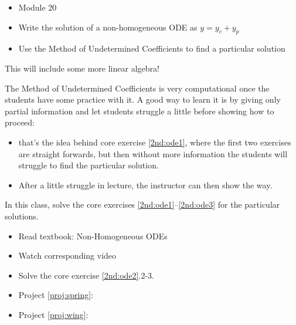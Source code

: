 \begin{lesson}

	\begin{itemize}
		\item Module 20
	\end{itemize}

	\begin{itemize}
		\item Write the solution of a non-homogeneous ODE as $y=y_c+y_p$
		\item Use the Method of Undetermined Coefficients to find a particular solution
	\end{itemize}
	

This will include some more linear algebra! 

The Method of Undetermined Coefficients is very computational once the students have some practice with it. A good way to learn it is by giving only partial information and let students struggle a little before showing how to proceed: 
\begin{itemize}
	\item that's the idea behind core exercise \ref{2nd:ode1}, where the first two exercises are straight forwards, but then without more information the students will struggle to find the particular solution.
	\item After a little struggle in lecture, the instructor can then show the way.
\end{itemize}


In this class, solve the core exercises \ref{2nd:ode1}--\ref{2nd:ode3} for the particular solutions.

\begin{itemize}
	\item Read textbook: Non-Homogeneous ODEs
	\item Watch corresponding video
	\item Solve the core exercise \ref{2nd:ode2}.2-3.
\end{itemize}




\begin{itemize}
	\item Project \ref{proj:spring}: \springtitle
	\item Project \ref{proj:wing}: \wingtitle
\end{itemize}


\end{lesson}





